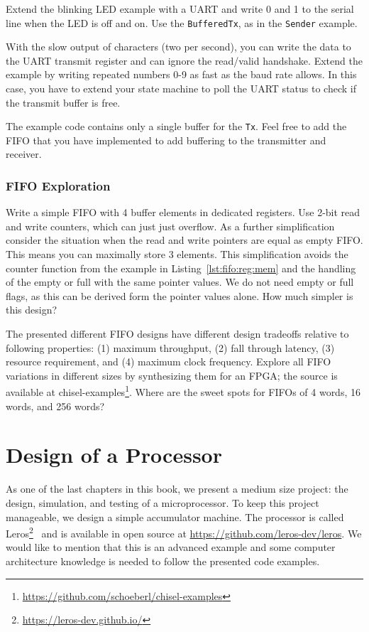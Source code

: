\documentclass[%
    10pt,
    headinclude, footexclude,
    openright, %
    notitlepage,
    cleardoubleempty,
    headsepline,
    pointlessnumbers,
    bibtotoc, idxtotoc,
    ]{scrbook}
\newcommand{\code}[1]{{\small{\texttt{#1}}}}
\newcommand{\myref}[2]{\href{#1}{#2}}
\renewcommand{\myref}[2]{{#2}{\footnote{\url{#1}}}}
\begin{document}
Extend the blinking LED example with a UART and write 0 and 1 to the serial
line when the LED is off and on. Use the \code{BufferedTx}, as in the \code{Sender}
example.

With the slow output of characters (two per second), you can write the data
to the UART transmit register and can ignore the read/valid handshake.
Extend the example by writing repeated numbers 0-9 as fast as the baud rate allows.
In this case, you have to extend your state machine to poll the UART status
to check if the transmit buffer is free.

The example code contains only a single buffer for the \code{Tx}. Feel free to
add the FIFO that you have implemented to add buffering to the transmitter
and receiver.

\subsection{FIFO Exploration}

Write a simple FIFO with 4 buffer elements in dedicated registers.
Use 2-bit read and write counters, which can just just overflow.
As a further simplification consider the situation when the read and write
pointers are equal as empty FIFO. This means you can maximally
store 3 elements. This simplification avoids the counter function from
the example in Listing~\ref{lst:fifo:reg:mem} and the handling
of the empty or full with the same pointer values. We do not need
empty or full flags, as this can be derived form the pointer values
alone. How much simpler is this design?

The presented different FIFO designs have different design tradeoffs
relative to following properties: (1) maximum throughput,
(2) fall through latency, (3) resource requirement, and (4)
maximum clock frequency. Explore all FIFO variations in different sizes by
synthesizing them for an FPGA; the source is available at
\myref{https://github.com/schoeberl/chisel-examples}{chisel-examples}.
Where are the sweet spots for FIFOs of 4 words, 16 words, and 256 words?

\chapter{Design of a Processor}


As one of the last chapters in this book, we present a medium size project:
the design, simulation, and testing of a microprocessor.
To keep this project manageable, we design a simple accumulator machine.
The processor is called \myref{https://leros-dev.github.io/}{Leros}~\cite{leros:arcs2019}
and is available in open source at \url{https://github.com/leros-dev/leros}.
We would like to mention that this is an advanced example and some computer
architecture knowledge is needed to follow the presented code examples.
\end{document}
